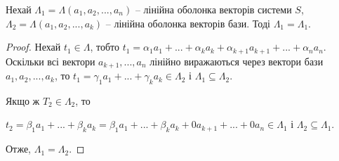 \begin{claim}
	Нехай $\Lambda_1 = \Lambda(a_1, a_2, ..., a_n)$ -- лінійна оболонка векторів
	системи $S$, $\Lambda_2 = \Lambda(a_1, a_2, ..., a_k)$ -- лінійна оболонка векторів бази.
	Тоді $\Lambda_1 = \Lambda_1$.
\end{claim}
\begin{proof}
	Нехай $t_1 \in \Lambda$, тобто $t_1 = \alpha_1 a_1 + ... + \alpha_k a_k + \alpha_{k+1} a_{k+1} + ... + \alpha_n a_n$.
	Оскільки всі вектори $a_{k+1}, ..., a_n$ лінійно виражаються через вектори бази
	$a_1, a_2, ..., a_k$, то $t_1 = \gamma_1 a_1 + ... + \gamma_k a_k \in \Lambda_2$ і $\Lambda_1 \subseteq \Lambda_2$.

	Якщо ж $T_2 \in \Lambda_2$, то

	$t_2 = \beta_1 a_1 + ... + \beta_k a_k = \beta_1 a_1 + ... + \beta_k a_k + 0 a_{k+1} + ... + 0 a_{n} \in \Lambda_1$ і $\Lambda_2 \subseteq \Lambda_1$.

	Отже, $\Lambda_1 = \Lambda_2$.
\end{proof}


